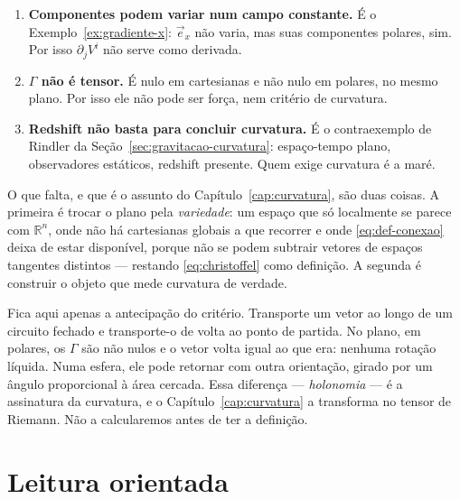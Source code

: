 \documentclass[12pt,a4paper,oneside]{book}
\theoremstyle{rgplain}
\theoremstyle{rgremark}
\begin{document}
\begin{enumerate}
  \item \textbf{Componentes podem variar num campo constante.} É o
  Exemplo~\ref{ex:gradiente-x}: $\vec e_x$ não varia, mas suas componentes
  polares, sim. Por isso $\partial_jV^i$ não serve como derivada.
  \item \textbf{$\Gamma$ não é tensor.} É nulo em cartesianas e não nulo em
  polares, no mesmo plano. Por isso ele não pode ser força, nem critério de
  curvatura.
  \item \textbf{Redshift não basta para concluir curvatura.} É o contraexemplo
  de Rindler da Seção~\ref{sec:gravitacao-curvatura}: espaço-tempo plano,
  observadores estáticos, redshift presente. Quem exige curvatura é a maré.
\end{enumerate}

O que falta, e que é o assunto do Capítulo~\ref{cap:curvatura}, são duas
coisas. A primeira é trocar o plano pela \emph{variedade}: um espaço que só
localmente se parece com $\mathbb{R}^n$, onde não há cartesianas globais a que
recorrer e onde \eqref{eq:def-conexao} deixa de estar disponível, porque não se
podem subtrair vetores de espaços tangentes distintos --- restando
\eqref{eq:christoffel} como definição. A segunda é
construir o objeto que mede curvatura de verdade.

\begin{atencao}
Fica aqui apenas a antecipação do critério. Transporte um vetor ao longo de um
circuito fechado e transporte-o de volta ao ponto de partida. No plano, em
polares, os $\Gamma$ são não nulos e o vetor volta igual ao que era: nenhuma
rotação líquida. Numa esfera, ele pode retornar com outra orientação, girado
por um ângulo proporcional à área cercada. Essa diferença --- \emph{holonomia} --- é a
assinatura da curvatura, e o Capítulo~\ref{cap:curvatura} a transforma no
tensor de Riemann. Não a calcularemos antes de ter a definição.
\end{atencao}

\section{Leitura orientada}
\label{sec:leitura-cap5}
\end{document}
